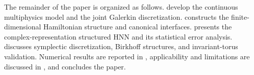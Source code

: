 The remainder of the paper is organized as follows.  develop the continuous multiphysics model and the joint Galerkin discretization.  constructs the finite-dimensional Hamiltonian structure and canonical interfaces.  presents the complex-representation structured HNN and its statistical error analysis.  discusses symplectic discretization, Birkhoff structures, and invariant-torus validation. Numerical results are reported in , applicability and limitations are discussed in , and  concludes the paper.
